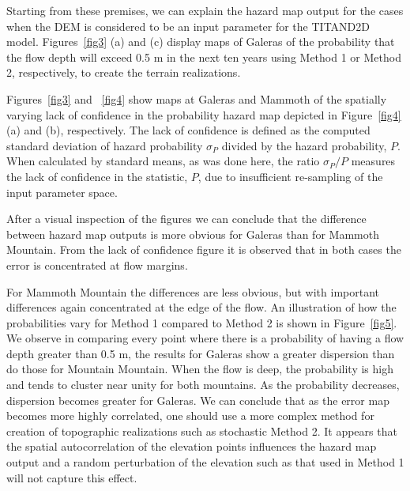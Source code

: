 \documentclass[12pt]{article}
\begin{document}
Starting from these premises, we can explain the hazard map output for
the cases when the DEM is considered to be an input parameter for the
TITAND2D model.  Figures~\ref{fig3} (a) and (c) display maps of
Galeras of the probability that the flow depth will exceed 0.5 m in
the next ten years using Method 1 or Method 2, respectively, to create
the terrain realizations.
 
Figures~\ref{fig3} and ~\ref{fig4} show maps at Galeras and Mammoth of
the spatially varying lack of confidence in the probability hazard map
depicted in Figure~\ref{fig4} (a) and (b), respectively. The lack of
confidence is defined as the computed standard deviation of hazard
probability $\sigma_P$ divided by the hazard probability, $P$.  When
calculated by standard means, as was done here, the ratio $\sigma_P/P$
measures the lack of confidence in the statistic, $P$, due to
insufficient re-sampling of the input parameter space.

After a visual inspection of the figures we can conclude that the
difference between hazard map outputs is more obvious for Galeras than
for Mammoth Mountain.  From the lack of confidence figure it is
observed that in both cases the error is concentrated at flow margins.

For Mammoth Mountain the differences are less obvious, but with
important differences again concentrated at the edge of the flow.  An
illustration of how the probabilities vary for Method 1 compared to
Method 2 is shown in Figure~\ref{fig5}. We observe in comparing every
point where there is a probability of having a flow depth greater than
0.5 m, the results for Galeras show a greater dispersion than do those
for Mountain Mountain.  When the flow is deep, the probability is high
and tends to cluster near unity for both mountains.  As the
probability decreases, dispersion becomes greater for Galeras.  We can
conclude that as the error map becomes more highly correlated, one
should use a more complex method for creation of topographic
realizations such as stochastic Method 2. It appears that the spatial
autocorrelation of the elevation points influences the hazard map
output and a random perturbation of the elevation such as that used in
Method 1 will not capture this effect.
\end{document}
